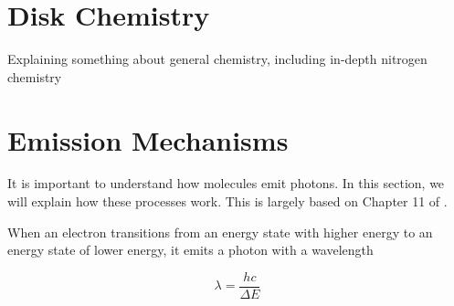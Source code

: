 \documentclass[twoside, single, authoryear, semicolon]{lion-msc}
\newcommand{\4}{$_4$}
\newcommand{\3}{$_3$}
\newcommand{\2}{$_2$}
\begin{document}


\section{Disk Chemistry}
Explaining something about general chemistry, including in-depth nitrogen chemistry

\section{Emission Mechanisms}
It is important to understand how molecules emit photons. In this section, we will explain how these processes work. This is largely based on Chapter 11 of \cite{1979rpa..book.....R}. 

When an electron transitions from an energy state with higher energy to an energy state of lower energy, it emits a photon with a wavelength

\begin{equation}
    \lambda=\frac{hc}{\Delta E}
\end{equation}
\end{document}
